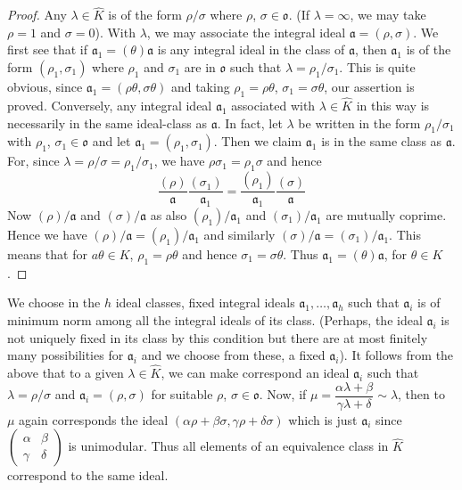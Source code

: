 \begin{proof}
Any $\lambda\in\hat{K}$ is of the form $\rho/\sigma$ where $\rho$,
$\sigma\in \mathfrak{o}$. (If $\lambda=\infty$, we may take $\rho=1$
and $\sigma=0$). With $\lambda$, we may associate the integral ideal
$\mathfrak{a}=(\rho,\sigma)$. We first see that if
$\mathfrak{a}_{1}=(\theta)\mathfrak{a}$ is any integral ideal in the
class of $\mathfrak{a}$, then $\mathfrak{a}_{1}$ is of the form
$(\rho_{1},\sigma_{1})$ where $\rho_{1}$ and $\sigma_{1}$ are in
$\mathfrak{o}$ such that $\lambda=\rho_{1}/\sigma_{1}$. This is quite
obvious, since $\mathfrak{a}_{1}=(\rho\theta,\sigma\theta)$ and taking
$\rho_{1}=\rho\theta$, $\sigma_{1}=\sigma\theta$, our assertion is
proved. Conversely, any integral ideal $\mathfrak{a}_{1}$ associated
with $\lambda\in\hat{K}$ in this way is necessarily in the same
ideal-class as $\mathfrak{a}$. In fact, let $\lambda$ be written in
the form $\rho_{1}/\sigma_{1}$ with $\rho_{1}$,
$\sigma_{1}\in\mathfrak{o}$ and let
$\mathfrak{a}_{1}=(\rho_{1},\sigma_{1})$. Then we claim
$\mathfrak{a}_{1}$ is in the same class as $\mathfrak{a}$. For, since
$\lambda=\rho/\sigma=\rho_{1}/\sigma_{1}$, we have
$\rho\sigma_{1}=\rho_{1}\sigma$ and hence
$$
\frac{(\rho)}{\mathfrak{a}}\frac{(\sigma_{1})}{\mathfrak{a}_{1}}=\frac{(\rho_{1})}{\mathfrak{a}_{1}}\frac{(\sigma)}{\mathfrak{a}}
$$
Now $(\rho)/\mathfrak{a}$ and $(\sigma)/\mathfrak{a}$ as also
$(\rho_{1})/\mathfrak{a}_{1}$ and $(\sigma_{1})/\mathfrak{a}_{1}$ are
mutually coprime. Hence we have
$(\rho)/\mathfrak{a}=(\rho_{1})/\mathfrak{a}_{1}$ and similarly
$(\sigma)/\mathfrak{a}=(\sigma_{1})/\mathfrak{a}_{1}$. This means that
for $a\theta\in K$, $\rho_{1}=\rho\theta$ and hence
$\sigma_{1}=\sigma\theta$. Thus
$\mathfrak{a}_{1}=(\theta)\mathfrak{a}$, for $\theta\in K$.
\end{proof}

We choose in the $h$ ideal classes, fixed integral ideals
$\mathfrak{a}_{1},\ldots,\mathfrak{a}_{h}$ such that\pageoriginale
$\mathfrak{a}_{i}$ is of minimum norm among all the integral ideals of
its class. (Perhaps, the ideal $\mathfrak{a}_{i}$ is not uniquely
fixed in its class by this condition but there are at most finitely
many possibilities for $\mathfrak{a}_{i}$ and we choose from these, a
fixed $\mathfrak{a}_{i}$). It follows from the above that to a given
$\lambda\in \hat{K}$, we can make correspond an ideal
$\mathfrak{a}_{i}$ such that $\lambda=\rho/\sigma$ and
$\mathfrak{a}_{i}=(\rho,\sigma)$ for suitable $\rho$, $\sigma\in
\mathfrak{o}$. Now, if
$\mu=\dfrac{\alpha\lambda+\beta}{\gamma\lambda+\delta}\sim\lambda$,
then to $\mu$ again corresponds the ideal
$(\alpha\rho+\beta\sigma,\gamma\rho+\delta\sigma)$ which is just
$\mathfrak{a}_{i}$ since $\left(\begin{smallmatrix} \alpha &
  \beta\\ \gamma & \delta\end{smallmatrix}\right)$ is unimodular. Thus
  all elements of an equivalence class in $\hat{K}$ correspond to
  the same ideal.

